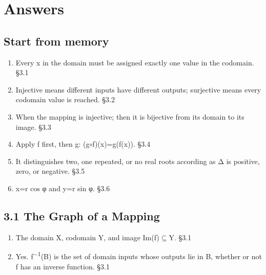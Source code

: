 \documentclass[11pt]{article}
\begin{document}
\clearpage
\section{Answers}
\begin{keepsection}\subsection{Start from memory}

\begin{enumerate}
\item Every x in the domain must be assigned exactly one value in the codomain. \hfill{\small\color{FAUblue}§3.1}
\item Injective means different inputs have different outputs; surjective means every codomain value is reached. \hfill{\small\color{FAUblue}§3.2}
\item When the mapping is injective; then it is bijective from its domain to its image. \hfill{\small\color{FAUblue}§3.3}
\item Apply f first, then g: (g\ensuremath{\circ}f)(x)=g(f(x)). \hfill{\small\color{FAUblue}§3.4}
\item It distinguishes two, one repeated, or no real roots according as Δ is positive, zero, or negative. \hfill{\small\color{FAUblue}§3.5}
\item x=r cos φ and y=r sin φ. \hfill{\small\color{FAUblue}§3.6}
\end{enumerate}

\end{keepsection}
\begin{keepsection}\subsection{3.1 The Graph of a Mapping}

\begin{enumerate}
\item The domain X, codomain Y, and image Im(f)\ensuremath{\subseteq}Y. \hfill{\small\color{FAUblue}§3.1}
\item Yes. f\textsuperscript{\ensuremath{-}1}(B) is the set of domain inputs whose outputs lie in B, whether or not f has an inverse function. \hfill{\small\color{FAUblue}§3.1}
\end{enumerate}

\end{keepsection}
\end{document}
